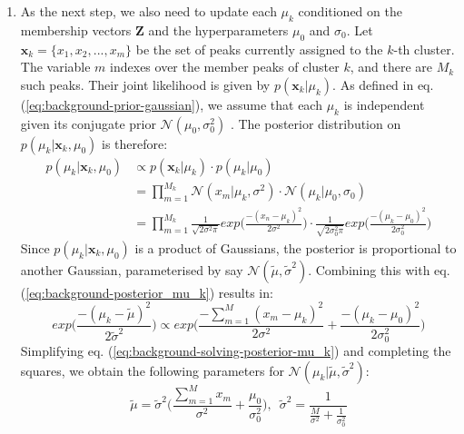 \begin{enumerate}
\item As the next step, we also need to update each $\mu_k$ conditioned on the membership vectors $\boldsymbol{Z}$ and the hyperparameters $\mu_0$ and $\sigma_0$. Let $\boldsymbol{x}_k=\{x_1, x_2, ..., x_m\}$ be the set of peaks currently assigned to the $k$-th cluster. The variable $m$ indexes over the member peaks of cluster $k$, and there are $M_k$ such peaks. Their joint likelihood is given by $p(\boldsymbol{x}_k \vert \mu_k)$. As defined in eq. (\ref{eq:background-prior-gaussian}), we assume that each $\mu_k$ is independent given its conjugate prior $\mathcal{N}(\mu_0, \sigma_0^2)$ . The posterior distribution on $p(\mu_k \vert \boldsymbol{x}_k, \mu_0)$ is therefore:
\begin{equation}
\begin{aligned}
p(\mu_k \vert \boldsymbol{x}_k, \mu_0) &\propto p(\boldsymbol{x}_k \vert \mu_k) \cdot p(\mu_k \vert \mu_0) \\
                                                              &= \prod_{m=1}^{M_k} \mathcal{N}(x_m \vert \mu_k, \sigma^2) \cdot \mathcal{N}(\mu_k \vert \mu_0, \sigma_0) \\
                                                           &= \prod_{m=1}^{M_k} \frac{1}{\sqrt{2\sigma^2\pi}} exp\bigg(\frac{-(x_n-\mu_k)^2}{2\sigma^2} \bigg) \cdot \frac{1}{\sqrt{2\sigma_0^2\pi}} exp\bigg(\frac{-(\mu_k-\mu_0)^2}{2\sigma_0^2} \bigg)
\end{aligned}                                                           
\label{eq:background-posterior_mu_k}
\end{equation}
Since $p(\mu_k \vert \boldsymbol{x}_k, \mu_0)$ is a product of Gaussians, the posterior is proportional to another Gaussian, parameterised by say $\mathcal{N}(\tilde{\mu}, \tilde{\sigma}^2)$. Combining this with eq. (\ref{eq:background-posterior_mu_k}) results in:
\begin{equation}
exp\bigg(\frac{-(\mu_k-\tilde{\mu})^2}{2\tilde{\sigma}^2} \bigg) \propto exp\bigg(\frac{-\sum_{m=1}^{M} (x_m-\mu_k)^2}{2\sigma^2} + \frac{-(\mu_k-\mu_0)^2}{2\sigma_0^2}\bigg)
\label{eq:background-solving-posterior-mu_k}
\end{equation}
Simplifying eq. (\ref{eq:background-solving-posterior-mu_k}) and completing the squares, we obtain the following parameters for $\mathcal{N}(\mu_k \vert \tilde{\mu}, \tilde{\sigma}^2)$:
\begin{equation}
\tilde{\mu} = \tilde{\sigma}^2 \bigg( \frac{\sum_{m=1}^{M} x_m}{\sigma^2} + \frac{\mu_0}{\sigma_0^2} \bigg), \enspace
\tilde{\sigma}^2 = \frac{1}{\frac{M}{\sigma^2} + \frac{1}{\sigma^2_0}} 
\label{eq:background-tilde-mu-sigma}
\end{equation}


\end{enumerate}
